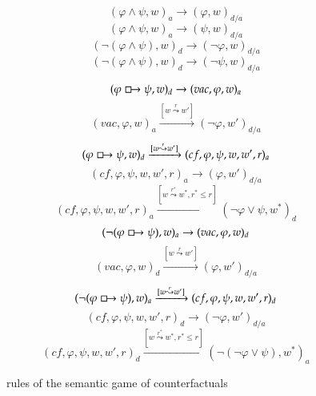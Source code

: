 \documentclass[a4paper,american]{paper}
\begin{document}
\begin{figure}[H]
	\begin{equation}
		(\varphi\wedge\psi ,w)_a\rightarrow (\varphi ,w)_{d/a}
	\end{equation}
	\begin{equation}
		(\varphi\wedge\psi ,w)_a\rightarrow (\psi ,w)_{d/a}
	\end{equation}
	\begin{equation}
		(\neg (\varphi\wedge\psi ),w)_d\rightarrow (\neg\varphi ,w)_{d/a}
	\end{equation}
	\begin{equation}
		(\neg (\varphi\wedge\psi ),w)_d\rightarrow (\neg\psi ,w)_{d/a}
	\end{equation}	
	
	\begin{equation}
		(\varphi\boxright\psi ,w)_d\rightarrow (vac,\varphi ,w)_a
	\end{equation}
	\begin{equation}
		(vac,\varphi ,w)_a\xrightarrow{[w\overset{r}{\leadsto}w']}(\neg\varphi ,w')_{d/a}
	\end{equation}
	\begin{equation}
		(\varphi\boxright\psi ,w)_d\xrightarrow{[w\overset{r}{\leadsto}w']}(cf,\varphi ,\psi ,w,w',r)_a
	\end{equation}
	\begin{equation}
		(cf,\varphi ,\psi ,w,w',r)_a\rightarrow (\varphi ,w')_{d/a}
	\end{equation}
	\begin{equation}
		(cf,\varphi ,\psi ,w,w',r)_a\xrightarrow{[w\overset{r^*}{\leadsto}w^*,r^*\leq r]}(\neg\varphi\vee\psi ,w^*)_d
	\end{equation}
	\begin{equation}
		(\neg (\varphi\boxright\psi ),w)_a\rightarrow (vac,\varphi ,w)_d
	\end{equation}
	\begin{equation}
		(vac,\varphi ,w)_d\xrightarrow{[w\overset{r}{\leadsto}w']} (\varphi ,w')_{d/a}
	\end{equation}
	\begin{equation}
		(\neg (\varphi\boxright\psi ),w)_a\xrightarrow{[w\overset{r}{\leadsto}w']}(cf,\varphi ,\psi ,w,w',r)_d
	\end{equation}
	\begin{equation}
		(cf,\varphi ,\psi ,w,w',r)_d\rightarrow(\neg\varphi ,w')_{d/a}
	\end{equation}
	\begin{equation}
		(cf,\varphi ,\psi ,w,w',r)_d\xrightarrow{[w\overset{r^*}{\leadsto}w^*, r^*\leq r]}(\neg(\neg\varphi\vee\psi ),w^*)_a
	\end{equation}
	\caption{rules of the semantic game of counterfactuals}
	\label{fig:rules}
\end{figure}
\end{document}
